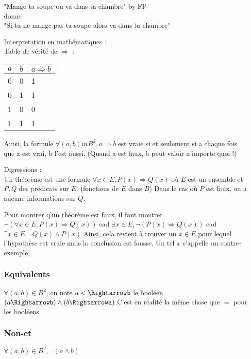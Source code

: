 \begin{ex}
    "Mange ta soupe ou va dans ta chambre"  by FP\\
    donne \\
    "Si tu ne mange pas ta soupe alors va dans ta chambre"\\
\end{ex}

Interpretation en mathématiques :\\
Table de vérité de $\Rightarrow$ :

    \begin{tabular}{|l|l|l|}
    $a$ & $b$ & $a\Rightarrow b$ \\ \hline
    0   & 0   & 1                \\ \hline
    0   & 1   & 1                \\ \hline
    1   & 0   & 0                \\ \hline
    1   & 1   & 1     \\ \hline          
    \end{tabular}


Ainsi, la formule $\forall (a,b) in B^2, a \Rightarrow b$ est vraie si et seulement si a chaque fois que a est vrai, b l'est aussi. (Quand a est faux, b peut valoir n'importe quoi !)

Digressions : \\
Un théorème est une formule $\forall x \in E, P(x) \Rightarrow Q(x)$ où $E$ est un ensemble et $P,Q$ des prédicats sur $E$. (fonctions de $E$ dans $B$)
Dans le cas où $P$ est faux, on a aucune informations sur $Q$. 

Pour montrer q'un théorème est faux, il faut montrer
$\lnot(\forall x \in E, P(x) \Rightarrow Q(x))$ cad $\exists x \in E, \lnot(P(x) \Rightarrow Q(x))$ cad $\exists x \in E, \lnot Q(x) \land P(x)$
Ainsi, cela revient à trouver un $x\in E$ pour lequel l'hypothèse est vraie mais la conclusion est fausse. Un tel $x$ s'appelle un contre-exemple

\subsubsection{Equivalents}
\begin{def}
    $\forall (a,b) \in B^2$, on note $a<\Rightarrowb$ le booléen $(a\Rightarrowb) \land (b\Rightarrowa)$
    C'est en réalité la même chose que $=$ pour les booléens
\end{def}

\subsubsection{Non-et}
\begin{def}
    $\forall (a,b) \in B^2,\lnot(a\land b)$ 
\end{def}

